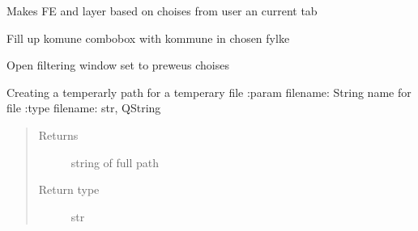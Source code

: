 \documentclass[letterpaper,10pt,english]{sphinxmanual}
\begin{document}
\begin{fulllineitems}
\begin{fulllineitems}
\begin{quote}
\begin{description}
\end{description}\end{quote}

\end{fulllineitems}


\begin{fulllineitems}
\label{\detokenize{code:Tilgjengelighet.Tilgjengelighet.filtrer}}
Makes FE and layer based on choises from user an current tab

\end{fulllineitems}


\begin{fulllineitems}
\label{\detokenize{code:Tilgjengelighet.Tilgjengelighet.fylke_valgt}}
Fill up komune combobox with kommune in chosen fylke

\end{fulllineitems}


\begin{fulllineitems}
\label{\detokenize{code:Tilgjengelighet.Tilgjengelighet.get_previus_search_activeLayer}}
Open filtering window set to preweus choises

\end{fulllineitems}


\begin{fulllineitems}
\label{\detokenize{code:Tilgjengelighet.Tilgjengelighet.get_temppath}}
Creating a temperarly path for a temperary file
:param filename: String name for file
:type filename: str, QString
\begin{quote}\begin{description}
\item[{Returns}] \leavevmode
string of full path

\item[{Return type}] \leavevmode
str


\end{description}
\end{quote}
\end{fulllineitems}
\end{fulllineitems}
\end{document}

